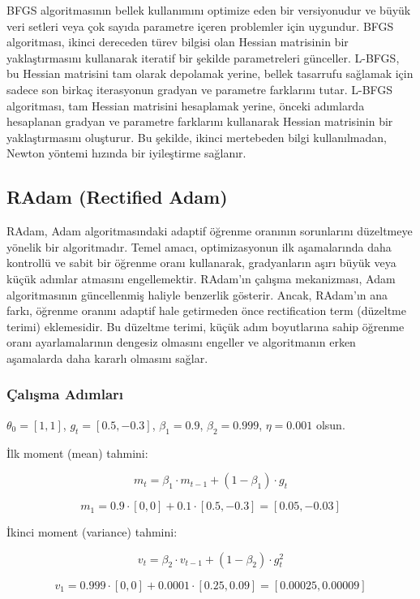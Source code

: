 BFGS algoritmasının bellek kullanımını optimize eden bir versiyonudur ve büyük veri setleri veya çok sayıda parametre içeren problemler için uygundur. BFGS algoritması, ikinci dereceden türev bilgisi olan Hessian matrisinin bir yaklaştırmasını kullanarak iteratif bir şekilde parametreleri günceller. L-BFGS, bu Hessian matrisini tam olarak depolamak yerine, bellek tasarrufu sağlamak için sadece son birkaç iterasyonun gradyan ve parametre farklarını tutar. L-BFGS algoritması, tam Hessian matrisini hesaplamak yerine, önceki adımlarda hesaplanan gradyan ve parametre farklarını kullanarak Hessian matrisinin bir yaklaştırmasını oluşturur. Bu şekilde, ikinci mertebeden bilgi kullanılmadan, Newton yöntemi hızında bir iyileştirme sağlanır.

\newpage

\subsection{RAdam (Rectified Adam)}

RAdam, Adam algoritmasındaki adaptif öğrenme oranının sorunlarını düzeltmeye yönelik bir algoritmadır. Temel amacı, optimizasyonun ilk aşamalarında daha kontrollü ve sabit bir öğrenme oranı kullanarak, gradyanların aşırı büyük veya küçük adımlar atmasını engellemektir. RAdam'ın çalışma mekanizması, Adam algoritmasının güncellenmiş haliyle benzerlik gösterir. Ancak, RAdam'ın ana farkı, öğrenme oranını adaptif hale getirmeden önce rectification term (düzeltme terimi) eklemesidir. Bu düzeltme terimi, küçük adım boyutlarına sahip öğrenme oranı ayarlamalarının dengesiz olmasını engeller ve algoritmanın erken aşamalarda daha kararlı olmasını sağlar.

\subsubsection{Çalışma Adımları}

$\theta_0 = [1, 1]$, $g_t = [0.5, -0.3]$, $\beta_1 = 0.9$, $\beta_2 = 0.999$, $\eta = 0.001$ olsun.

İlk moment (mean) tahmini:

\[ m_t = \beta_1 \cdot m_{t-1} + (1 - \beta_1) \cdot g_t \]

\[ m_1 = 0.9 \cdot [0, 0] + 0.1 \cdot [0.5, -0.3] = [0.05, -0.03] \]

İkinci moment (variance) tahmini:

\[ v_t = \beta_2 \cdot v_{t-1} + (1 - \beta_2) \cdot g_{t}^2 \]

\[ v_1 = 0.999 \cdot [0, 0] + 0.0001 \cdot [0.25, 0.09] = [0.00025, 0.00009] \]

